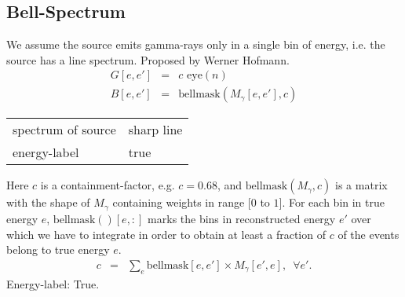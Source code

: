 \documentclass{article}%
\begin{document}
\subsection{Bell-Spectrum}
%
We assume the source emits gamma-rays only in a single bin of energy, i.e. the source has a line spectrum.
%
Proposed by Werner Hofmann.
\begin{eqnarray}
G[e, e'] &=& c \, \, \mathrm{eye}(n)
\\
B[e, e'] &=& \mathrm{bellmask}(M_{\gamma}[e, e'], c)
\end{eqnarray}
%
\begin{center}
\begin{tabular}{ll}
spectrum of source & sharp line\\
energy-label & true\\
\end{tabular}
\end{center}
%
Here $c$ is a containment-factor, e.g. $c = 0.68$,
%
and $\mathrm{bellmask}(M_{\gamma}, c)$ is a matrix with the shape of $M_{\gamma}$ containing weights in range $[0$ to $1]$.
%
For each bin in true energy $e$, $\mathrm{bellmask}()[e, :]$ marks the bins in reconstructed energy $e'$ over which we have to integrate in order to obtain at least a fraction of $c$ of the events belong to true energy $e$.
%
\begin{eqnarray}
c &=& \sum_e \mathrm{bellmask}[e ,e'] \times M_{\gamma}[e', e], \, \, \, \forall e'.
\end{eqnarray}
%
Energy-label: True.
%
%
%
\end{document}
